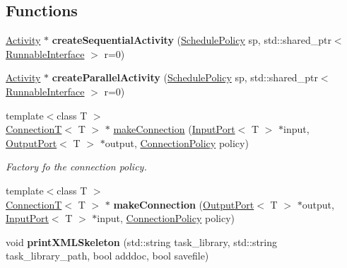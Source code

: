 \subsection*{Functions}
\begin{DoxyCompactItemize}
\item 
\hypertarget{namespacecoco_a42f5b31ac6886c63c9dfc27cccb4b2a1}{}\hyperlink{classcoco_1_1_activity}{Activity} $\ast$ {\bfseries create\+Sequential\+Activity} (\hyperlink{structcoco_1_1_schedule_policy}{Schedule\+Policy} sp, std\+::shared\+\_\+ptr$<$ \hyperlink{classcoco_1_1_runnable_interface}{Runnable\+Interface} $>$ r=0)\label{namespacecoco_a42f5b31ac6886c63c9dfc27cccb4b2a1}

\item 
\hypertarget{namespacecoco_a9149c0ad2cb2e734ba6309847ed07774}{}\hyperlink{classcoco_1_1_activity}{Activity} $\ast$ {\bfseries create\+Parallel\+Activity} (\hyperlink{structcoco_1_1_schedule_policy}{Schedule\+Policy} sp, std\+::shared\+\_\+ptr$<$ \hyperlink{classcoco_1_1_runnable_interface}{Runnable\+Interface} $>$ r=0)\label{namespacecoco_a9149c0ad2cb2e734ba6309847ed07774}

\item 
\hypertarget{namespacecoco_a71a876d93aa975818abf31b99f4f6cde}{}{\footnotesize template$<$class T $>$ }\\\hyperlink{classcoco_1_1_connection_t}{Connection\+T}$<$ T $>$ $\ast$ \hyperlink{namespacecoco_a71a876d93aa975818abf31b99f4f6cde}{make\+Connection} (\hyperlink{classcoco_1_1_input_port}{Input\+Port}$<$ T $>$ $\ast$input, \hyperlink{classcoco_1_1_output_port}{Output\+Port}$<$ T $>$ $\ast$output, \hyperlink{structcoco_1_1_connection_policy}{Connection\+Policy} policy)\label{namespacecoco_a71a876d93aa975818abf31b99f4f6cde}

\begin{DoxyCompactList}\small\item\em Factory fo the connection policy. \end{DoxyCompactList}\item 
\hypertarget{namespacecoco_a1188c0d028501a4ee1a9cc236be9f61a}{}{\footnotesize template$<$class T $>$ }\\\hyperlink{classcoco_1_1_connection_t}{Connection\+T}$<$ T $>$ $\ast$ {\bfseries make\+Connection} (\hyperlink{classcoco_1_1_output_port}{Output\+Port}$<$ T $>$ $\ast$output, \hyperlink{classcoco_1_1_input_port}{Input\+Port}$<$ T $>$ $\ast$input, \hyperlink{structcoco_1_1_connection_policy}{Connection\+Policy} policy)\label{namespacecoco_a1188c0d028501a4ee1a9cc236be9f61a}

\item 
\hypertarget{namespacecoco_a6b00babdb26f6e8da987cc56c8cecb30}{}void {\bfseries print\+X\+M\+L\+Skeleton} (std\+::string task\+\_\+library, std\+::string task\+\_\+library\+\_\+path, bool adddoc, bool savefile)\label{namespacecoco_a6b00babdb26f6e8da987cc56c8cecb30}

\end{DoxyCompactItemize}


